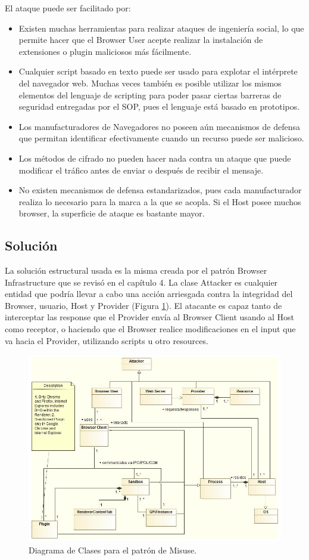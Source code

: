 El ataque puede ser facilitado por:
\begin{itemize}
	\item Existen muchas herramientas para realizar ataques de ingeniería social, lo que permite hacer que el Browser User acepte realizar la instalación de extensiones o plugin maliciosos más fácilmente.
	\item Cualquier script basado en texto puede ser usado para explotar el intérprete del navegador web. Muchas veces también es posible utilizar los mismos elementos del lenguaje de scripting para poder pasar ciertas barreras de seguridad entregadas por el SOP, pues el lenguaje está basado en prototipos. 
	\item Los manufacturadores de Navegadores no poseen aún mecanismos de defensa que permitan identificar efectivamente cuando un recurso puede ser malicioso.
	\item Los métodos de cifrado no pueden hacer nada contra un ataque que puede modificar el tráfico antes de enviar o después de recibir el mensaje.
	\item No existen mecanismos de defensa estandarizados, pues cada manufacturador realiza lo necesario para la marca a la que se acopla. Si el Host posee muchos browser, la superficie de ataque es bastante mayor.
\end{itemize}
\subsection{Solución}
La solución estructural usada es la misma creada por el patrón Browser Infrastructure que se revisó en el capítulo 4. La clase Attacker es cualquier entidad que podría llevar a cabo una acción arriesgada contra la integridad del Browser, usuario, Host y Provider (Figura \ref{fig:BIMisuse}). El atacante es capaz tanto de interceptar las response que el Provider envía al Browser Client usando al Host como receptor, o haciendo que el Browser realice modificaciones en el input que va hacia el Provider, utilizando scripts u otro resources.
\begin{figure}[h!t]
	        \centering
	        \includegraphics[scale=0.45]{figures/chap5/patronMisuse.jpg}
	        \caption{Diagrama de Clases para el patrón de Misuse.}
	        \label{fig:BIMisuse}
    \end{figure}

